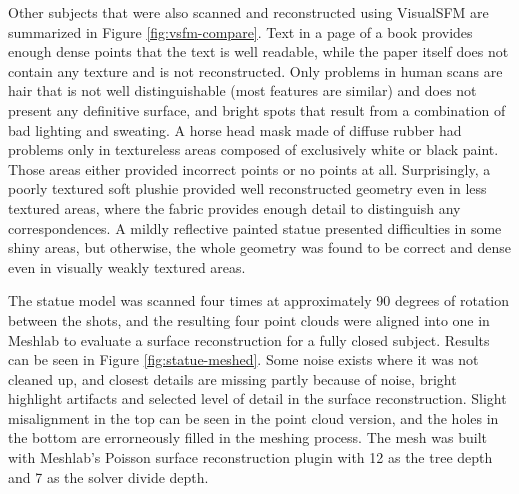 
Other subjects that were also scanned and reconstructed using VisualSFM are summarized in Figure \ref{fig:vsfm-compare}.
Text in a page of a book provides enough dense points that the text is well readable, while the paper itself does not contain any texture and is not reconstructed.
Only problems in human scans are hair that is not well distinguishable (most features are similar) and does not present any definitive surface, and bright spots that result from a combination of bad lighting and sweating.
A horse head mask made of diffuse rubber had problems only in textureless areas composed of exclusively white or black paint.
Those areas either provided incorrect points or no points at all.
Surprisingly, a poorly textured soft plushie provided well reconstructed geometry even in less textured areas, where the fabric provides enough detail to distinguish any correspondences.
A mildly reflective painted statue presented difficulties in some shiny areas, but otherwise, the whole geometry was found to be correct and dense even in visually weakly textured areas.


The statue model was scanned four times at approximately 90 degrees of rotation between the shots, and the resulting four point clouds were aligned into one in Meshlab to evaluate a surface reconstruction for a fully closed subject.
Results can be seen in Figure \ref{fig:statue-meshed}.
Some noise exists where it was not cleaned up, and closest details are missing partly because of noise, bright highlight artifacts and selected level of detail in the surface reconstruction.
Slight misalignment in the top can be seen in the point cloud version, and the holes in the bottom are errorneously filled in the meshing process.
The mesh was built with Meshlab's Poisson surface reconstruction plugin with 12 as the tree depth and  7 as the solver divide depth.

